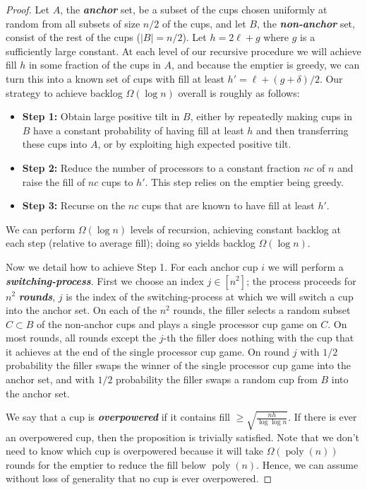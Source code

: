 \documentclass[twocolumn]{article}[11pt]
\newcommand{\defn}[1]{{\textit{\textbf{\boldmath #1}}}}
\DeclareMathOperator{\poly}{\text{poly}}
\begin{document}
\begin{proof}
  Let $A$, the \defn{anchor} set, be a subset of the cups chosen uniformly at
  random from all subsets of size $n/2$ of the cups, and let $B$, the
  \defn{non-anchor} set, consist of the rest of the cups ($|B| = n/2$). 
  Let $h = 2 \ell + g $ where $g$ is a sufficiently large constant. At each
  level of our recursive procedure we will achieve fill $h$ in some fraction of
  the cups in $A$, and because the emptier is greedy, we can turn this into a
  known set of cups with fill at least $h' = \ell + (g+\delta)/2$.
  Our strategy to achieve backlog $\Omega(\log n)$ overall is roughly as follows:
  \begin{itemize}
    \item \textbf{Step 1:} 
      Obtain large positive tilt in $B$, either by repeatedly making cups in $B$ have a constant probability of having
      fill at least $h$ and then transferring these cups into $A$, or by
      exploiting high expected positive tilt.
  \item \textbf{Step 2:} Reduce the number of processors to a constant fraction $nc$ of $n$ and
    raise the fill of $nc$ cups to $h'$. This step relies on the emptier being
    greedy.
  \item \textbf{Step 3:} Recurse on the $nc$ cups that are known to have fill at least $h'$.
\end{itemize}
We can perform $\Omega(\log n)$ levels of recursion, achieving constant backlog
at each step (relative to average fill); doing so yields backlog $\Omega(\log
n)$.

Now we detail how to achieve Step 1.
For each anchor cup $i$ we will perform a \defn{switching-process}.
First we choose an index $j \in [n^2]$; the process proceeds for $n^2$
\defn{rounds}, $j$ is the index of the switching-process at which we will
switch a cup into the anchor set.
On each of the $n^2$ rounds, the filler selects a random subset $C\subset B$ of
the non-anchor cups and plays a single processor cup game on $C$.
On most rounds, all rounds except the $j$-th the filler does nothing with the
cup that it achieves at the end of the single processor cup game.
On round $j$ with $1/2$ probability the filler swaps the winner of the single processor
cup game into the anchor set, and with $1/2$ probability the filler swaps a random cup
from $B$ into the anchor set.

We say that a cup is \defn{overpowered} if it contains fill $\ge
\sqrt{\frac{nh}{\log\log n}}$. If there is ever an overpowered cup, then the
proposition is trivially satisfied. Note that we don't need to know which cup
is overpowered because it will take $\Omega(\poly(n))$ rounds for the emptier
to reduce the fill below $\poly(n)$. Hence, we can assume without loss
of generality that no cup is ever overpowered.


\end{proof}
\end{document}
